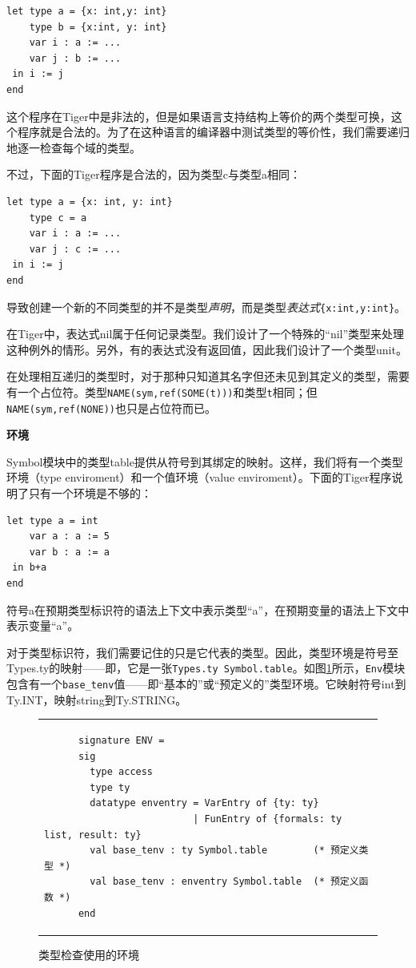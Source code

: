 \documentclass[cn,11pt,chinese]{elegantbook}
\begin{document}
\begin{lstlisting}
let type a = {x: int,y: int}
    type b = {x:int, y: int}
    var i : a := ...
    var j : b := ...
 in i := j
end
\end{lstlisting}
 
这个程序在Tiger中是非法的，但是如果语言支持结构上等价的两个类型可换，这个程序就是合法的。为了在这种语言的编译器中测试类型的等价性，我们需要递归地逐一检查每个域的类型。

不过，下面的Tiger程序是合法的，因为类型c与类型a相同：

\begin{lstlisting}
let type a = {x: int, y: int}
    type c = a
    var i : a := ...
    var j : c := ...
 in i := j
end
\end{lstlisting}

导致创建一个新的不同类型的并不是类型\textit{声明}，而是类型\textit{表达式}\lstinline|{x:int,y:int}|。

在Tiger中，表达式nil属于任何记录类型。我们设计了一个特殊的“nil”类型来处理这种例外的情形。另外，有的表达式没有返回值，因此我们设计了一个类型unit。

在处理相互递归的类型时，对于那种只知道其名字但还未见到其定义的类型，需要有一个占位符。类型\lstinline{NAME(sym,ref(SOME(t)))}和类型\lstinline{t}相同；但\lstinline{NAME(sym,ref(NONE))}也只是占位符而已。

\textbf{环境}

Symbol模块中的类型table提供从符号到其绑定的映射。这样，我们将有一个类型环境（type enviroment）和一个值环境（value enviroment）。下面的Tiger程序说明了只有一个环境是不够的：

\begin{lstlisting}
let type a = int
    var a : a := 5
    var b : a := a
 in b+a
end
\end{lstlisting}

符号a在预期类型标识符的语法上下文中表示类型“a”，在预期变量的语法上下文中表示变量“a”。

对于类型标识符，我们需要记住的只是它代表的类型。因此，类型环境是符号至Types.ty的映射——即，它是一张\lstinline|Types.ty Symbol.table|。如图\ref{fig:5-8}所示，\lstinline{Env}模块包含有一个\lstinline{base_tenv}值——即“基本的”或“预定义的”类型环境。它映射符号int到Ty.INT，映射string到Ty.STRING。

\begin{figure}[htbp]
  \centering
  \begin{tabular}{l}
    \begin{lstlisting}
      signature ENV =
      sig
        type access
        type ty
        datatype enventry = VarEntry of {ty: ty}
                          | FunEntry of {formals: ty list, result: ty}
        val base_tenv : ty Symbol.table        (* 预定义类型 *)
        val base_tenv : enventry Symbol.table  (* 预定义函数 *)
      end
    \end{lstlisting}
  \end{tabular}
  \caption{类型检查使用的环境}
  \label{fig:5-8}
\end{figure}
\end{document}
